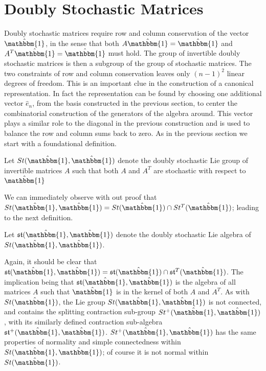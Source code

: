 \section{Doubly Stochastic Matrices}
Doubly stochastic matrices require row and column conservation of the vector $\hat{\mathbbm{1}}$, 
in the sense that both $A \hat{\mathbbm{1}} = \hat{\mathbbm{1}}$ and $A^T \hat{\mathbbm{1}} = \hat{\mathbbm{1}}$ 
must hold. The group of invertible doubly stochastic matrices is then a subgroup
of the group of stochastic matrices. The two constraints of row and column 
conservation leaves only $\left(n - 1\right)^2$ linear degrees of freedom. This 
is an important clue in the construction of a canonical representation. In fact 
the representation can be found by choosing one additional vector $\hat{e}_n$, 
from the basis constructed in the previous section, to center the combinatorial 
construction of the generators of the algebra around. This vector plays a 
similar role to the diagonal in the previous construction and is used to balance 
the row and column sums back to zero. As in the previous section we start with 
a foundational definition.

\begin{definition}
	Let $St(\hat{\mathbbm{1}}, \hat{\mathbbm{1}})$ denote the doubly stochastic 
	Lie group of invertible matrices $A$ such that both $A$ and $A^T$ are 
	stochastic with respect to $\hat{\mathbbm{1}}$
\end{definition}

We can immediately observe with out proof that $St(\hat{\mathbbm{1}}, \hat{\mathbbm{1}}) = St(\hat{\mathbbm{1}}) \cap St^T(\hat{\mathbbm{1}})$;
leading to the next definition.

\begin{definition}
	Let $\mathfrak{st}(\hat{\mathbbm{1}}, \hat{\mathbbm{1}})$ denote the doubly 
	stochastic Lie algebra of $St(\hat{\mathbbm{1}},\hat{\mathbbm{1}})$.
\end{definition}

Again, it should be clear that $\mathfrak{st}(\hat{\mathbbm{1}}, \hat{\mathbbm{1}}) = \mathfrak{st}(\hat{\mathbbm{1}}) \cap \mathfrak{st}^T(\hat{\mathbbm{1}})$.
The implication being that $\mathfrak{st}(\hat{\mathbbm{1}}, \hat{\mathbbm{1}})$
is the algebra of all matrices $A$ such that $\hat{\mathbbm{1}}$ is in the 
kernel of both $A$ and $A^T$. As with $St(\hat{\mathbbm{1}})$, the Lie group $St(\hat{\mathbbm{1}}, \hat{\mathbbm{1}})$
is not connected, and contains the splitting contraction sub-group $St^{+}(\hat{\mathbbm{1}}, \hat{\mathbbm{1}})$,
with its similarly defined contraction sub-algebra $\mathfrak{st}^{+}(\hat{\mathbbm{1}}, \hat{\mathbbm{1}})$. 
$St^{+}(\hat{\mathbbm{1}}, \hat{\mathbbm{1}})$ has the same properties of 
normality and simple connectedness within $St(\hat{\mathbbm{1}}, \hat{\mathbbm{1}})$; 
of course it is not normal within $St(\hat{\mathbbm{1}})$.

